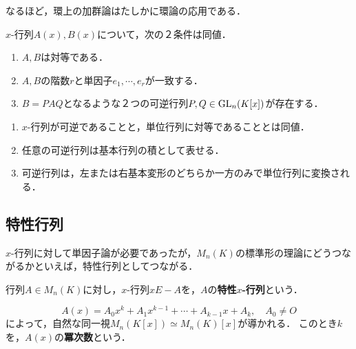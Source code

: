 \documentclass[uplatex,dvipdfmx]{jsreport}
\begin{document}
\begin{remarks}
    なるほど，環上の加群論はたしかに環論の応用である．
\end{remarks}

\begin{corollary}[行列の相似性の特徴付け]
    $x$-行列$A(x),B(x)$について，次の２条件は同値．
    \begin{enumerate}
        \item $A,B$は対等である．
        \item $A,B$の階数$r$と単因子$e_1,\cdots,e_r$が一致する．
        \item $B=PAQ$となるような２つの可逆行列$P,Q\in\mathrm{GL}_n(K[x])$が存在する．
    \end{enumerate}
\end{corollary}

\begin{corollary}\mbox{}
    \begin{enumerate}
        \item $x$-行列が可逆であることと，単位行列に対等であることとは同値．
        \item 任意の可逆行列は基本行列の積として表せる．
        \item 可逆行列は，左または右基本変形のどちらか一方のみで単位行列に変換される．
    \end{enumerate}
\end{corollary}

\subsection{特性行列}

\begin{tcolorbox}[colframe=ForestGreen, colback=ForestGreen!10!white,breakable,colbacktitle=ForestGreen!40!white,coltitle=black,fonttitle=\bfseries\sffamily,
title=]
    $x$-行列に対して単因子論が必要であったが，$M_n(K)$の標準形の理論にどうつながるかといえば，特性行列としてつながる．
\end{tcolorbox}

\begin{definition}
    行列$A\in M_n(K)$に対し，$x$-行列$xE-A$を，$A$の\textbf{特性$x$-行列}という．
\end{definition}

\begin{definition}[degree]
    \[A(x)=A_0x^k+A_1x^{k-1}+\cdots+A_{k-1}x+A_k,\quad A_0\ne O\]
    によって，自然な同一視$M_n(K[x])\simeq M_n(K)[x]$が導かれる．
    このとき$k$を，$A(x)$の\textbf{冪次数}という．
\end{definition}
\end{document}
